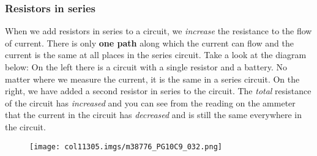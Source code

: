             \subsubsection{ Resistors in series}
            \nopagebreak
          \label{m38776*id67450}When we add resistors in series to a circuit, we \textsl{increase} the resistance to the flow of current. There is only \textbf{one path} along which the current can flow and the current is the same at all places in the series circuit. Take a look at the diagram below: On the left there is a circuit with a single resistor and a battery. No matter where we measure the current, it is the same in a series circuit. On the right, we have added a second resistor in series to the circuit. The \textsl{total} resistance of the circuit has \textsl{increased} and you can see from the reading on the ammeter that the current in the circuit has \textsl{decreased} and is still the same everywhere in the circuit.\par 
          \label{m38776*id67481}
    \setcounter{subfigure}{0}
	\begin{figure}[H] %
    \begin{center}
    \label{m38776*id67485!!!underscore!!!media}\label{m38776*id67485!!!underscore!!!printimage}\texttt{[image: col11305.imgs/m38776\_PG10C9\_032.png]} %
      \vspace{2pt}
    \vspace{.1in}
    \end{center}
 \end{figure}       
          \par 
